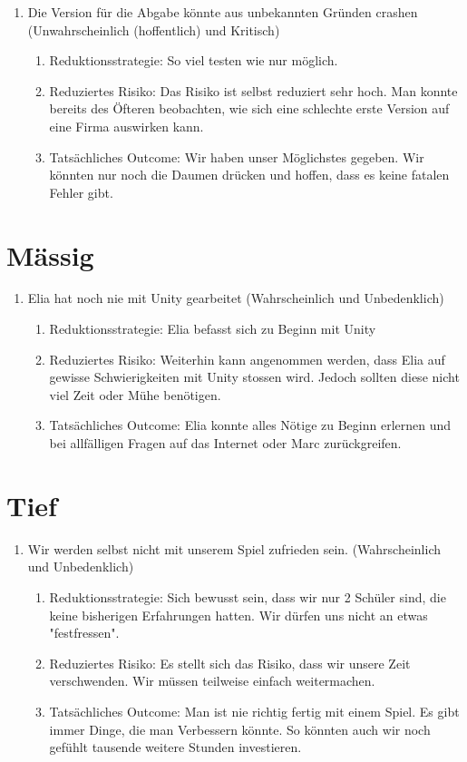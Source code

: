 \begin{enumerate}
    \item Die Version für die Abgabe könnte aus unbekannten Gründen crashen (Unwahrscheinlich (hoffentlich) und Kritisch)
    \begin{enumerate}
        \item Reduktionsstrategie: So viel testen wie nur möglich.
        \item Reduziertes Risiko: Das Risiko ist selbst reduziert sehr hoch. Man konnte bereits des Öfteren beobachten, wie sich eine schlechte erste Version auf eine Firma auswirken kann.
        \item Tatsächliches Outcome: Wir haben unser Möglichstes gegeben. Wir könnten nur noch die Daumen drücken und hoffen, dass es keine fatalen Fehler gibt.
    \end{enumerate}

\end{enumerate}

\section{Mässig}
\begin{enumerate}
    \item Elia hat noch nie mit Unity gearbeitet (Wahrscheinlich und Unbedenklich)
    \begin{enumerate}
        \item Reduktionsstrategie: Elia befasst sich zu Beginn mit Unity
        \item Reduziertes Risiko: Weiterhin kann angenommen werden, dass Elia auf gewisse Schwierigkeiten mit Unity stossen wird.
              Jedoch sollten diese nicht viel Zeit oder Mühe benötigen. 
        \item Tatsächliches Outcome: Elia konnte alles Nötige zu Beginn erlernen und bei allfälligen Fragen auf das Internet oder Marc zurückgreifen.
    \end{enumerate}
\end{enumerate}

\section{Tief}
\begin{enumerate}
    \item Wir werden selbst nicht mit unserem Spiel zufrieden sein. (Wahrscheinlich und Unbedenklich)
    \begin{enumerate}
        \item Reduktionsstrategie: Sich bewusst sein, dass wir nur 2 Schüler sind, die keine bisherigen Erfahrungen hatten. Wir dürfen uns nicht an etwas "festfressen".
        \item Reduziertes Risiko: Es stellt sich das Risiko, dass wir unsere Zeit verschwenden. Wir müssen teilweise einfach weitermachen.
        \item Tatsächliches Outcome: Man ist nie richtig fertig mit einem Spiel. Es gibt immer Dinge, die man Verbessern könnte. So könnten auch wir noch gefühlt tausende weitere Stunden investieren.
    \end{enumerate}
\end{enumerate}